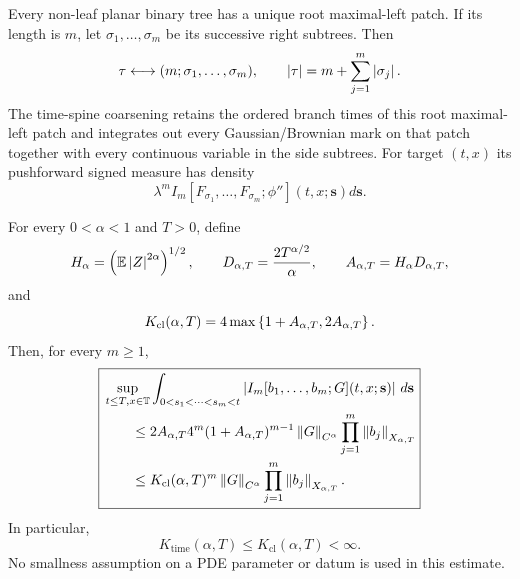 Every non-leaf planar binary tree has a unique root maximal-left patch. If its length is $m$, let $\sigma_1,\ldots,\sigma_m$ be its successive right subtrees. Then
\begin{equation}
  \tau
  \longleftrightarrow
  (m;\sigma_1,\ldots,\sigma_m),
  \qquad
  \left|\tau\right|
  =
  m+\sum_{j=1}^m\left|\sigma_j\right|.
  \label{eq:root-patch-decomposition}
\end{equation}
The time-spine coarsening retains the ordered branch times of this root maximal-left patch and integrates out every Gaussian/Brownian mark on that patch together with every continuous variable in the side subtrees. For target $(t,x)$ its pushforward signed measure has density
\begin{equation}
  \lambda^m
  I_m[F_{\sigma_1},\ldots,F_{\sigma_m};\phi'']
  (t,x;\mathbf s)d\mathbf s.
  \label{eq:time-spine-density}
\end{equation}

\begin{proposition}
\label{prop:K-time-finite}
For every $0<\alpha<1$ and $T>0$, define
\begin{equation*}
  H_\alpha
  =
  \left(\mathbb E\left|Z\right|^{2\alpha}\right)^{1/2},
  \qquad
  D_{\alpha,T}
  =
  \frac{2T^{\alpha/2}}{\alpha},
  \qquad
  A_{\alpha,T}
  =
  H_\alpha D_{\alpha,T},
\end{equation*}
and
\begin{equation}
  K_{\mathrm{cl}}(\alpha,T)
  =
  4\max\left\{
    1+A_{\alpha,T},
    2A_{\alpha,T}
  \right\}.
  \label{eq:K-cluster}
\end{equation}
Then, for every $m\geq1$,
\begin{equation}
  \boxed{
  \begin{aligned}
  &\sup_{t\leq T,x\in\mathbb T}
  \int_{0<s_1<\cdots<s_m<t}
  \left|I_m[b_1,\ldots,b_m;G](t,x;\mathbf s)\right|
  \,d\mathbf s\\
  &\qquad\leq
  2A_{\alpha,T}4^m
  (1+A_{\alpha,T})^{m-1}
  \left\lVert G\right\rVert_{C^\alpha}
  \prod_{j=1}^m\left\lVert b_j\right\rVert_{X_{\alpha,T}}\\
  &\qquad\leq
  K_{\mathrm{cl}}(\alpha,T)^m
  \left\lVert G\right\rVert_{C^\alpha}
  \prod_{j=1}^m\left\lVert b_j\right\rVert_{X_{\alpha,T}}.
  \end{aligned}
  }
  \label{eq:explicit-time-patch-bound}
\end{equation}
In particular,
\begin{equation}
  K_{\mathrm{time}}(\alpha,T)
  \leq
  K_{\mathrm{cl}}(\alpha,T)
  <\infty.
  \label{eq:K-time-explicit}
\end{equation}
No smallness assumption on a PDE parameter or datum is used in this estimate.
\end{proposition}

